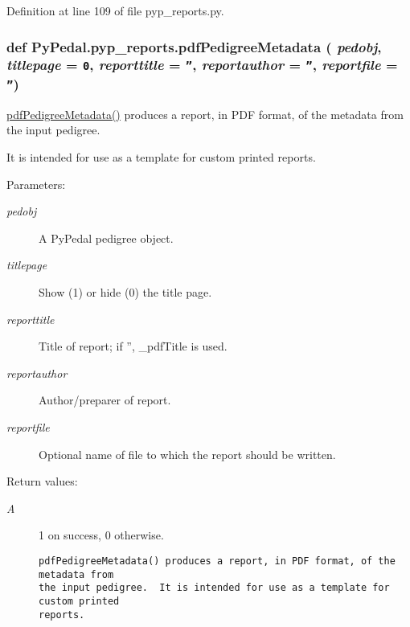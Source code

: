Definition at line 109 of file pyp\_\-reports.py.\hypertarget{namespacePyPedal_1_1pyp__reports_11a744e9a637f073c0457573fa82bd0c}{
\subsubsection[pdfPedigreeMetadata]{\setlength{\rightskip}{0pt plus 5cm}def Py\-Pedal.pyp\_\-reports.pdf\-Pedigree\-Metadata ( {\em pedobj},  {\em titlepage} = {\tt 0},  {\em reporttitle} = {\tt ''},  {\em reportauthor} = {\tt ''},  {\em reportfile} = {\tt ''})}}
\label{namespacePyPedal_1_1pyp__reports_11a744e9a637f073c0457573fa82bd0c}


\hyperlink{namespacePyPedal_1_1pyp__reports_11a744e9a637f073c0457573fa82bd0c}{pdf\-Pedigree\-Metadata()} produces a report, in PDF format, of the metadata from the input pedigree. 

It is intended for use as a template for custom printed reports. \begin{Desc}
\item[Parameters:]
\begin{description}
\item[{\em pedobj}]A Py\-Pedal pedigree object. \item[{\em titlepage}]Show (1) or hide (0) the title page. \item[{\em reporttitle}]Title of report; if '', \_\-pdf\-Title is used. \item[{\em reportauthor}]Author/preparer of report. \item[{\em reportfile}]Optional name of file to which the report should be written. \end{description}
\end{Desc}
\begin{Desc}
\item[Return values:]
\begin{description}
\item[{\em A}]1 on success, 0 otherwise.

\footnotesize\begin{verbatim}pdfPedigreeMetadata() produces a report, in PDF format, of the metadata from
the input pedigree.  It is intended for use as a template for custom printed
reports.
\end{verbatim}
\normalsize
 \end{description}
\end{Desc}



